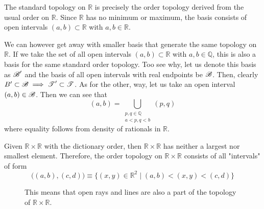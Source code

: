   \begin{example}
    The standard topology on $\mathbb{R}$ is precisely the order topology derived from the usual order on $\mathbb{R}$. Since $\mathbb{R}$ has no minimum or maximum, the basis consists of open intervals $(a, b) \subset \mathbb{R}$ with $a, b \in \mathbb{R}$. 
  \end{example}

  \begin{example}
    We can however get away with smaller basis that generate the same topology on $\mathbb{R}$. If we take the set of all open intervals $(a, b) \subset \mathbb{R}$ with $a, b \in \mathbb{Q}$, this is also a basis for the same standard order topology. Too see why, let us denote this basis as $\B^\prime$ and the basis of all open intervals with real endpoints be $\B$. Then, clearly $B^\prime \subset \B \implies \T^\prime \subset \T$. As for the other, way, let us take an open interval $(a, b) \in \B$. Then we can see that 
    \begin{equation}
      (a, b) = \bigcup_{\substack{p, q \in \mathbb{Q} \\ a < p, q < b}} (p, q)
    \end{equation}
    where equality follows from density of rationals in $\mathbb{R}$. 
  \end{example}

  \begin{example}
    Given $\mathbb{R} \times \mathbb{R}$ with the dictionary order, then $\mathbb{R} \times \mathbb{R}$ has neither a largest nor smallest element. Therefore, the order topology on $\mathbb{R} \times \mathbb{R}$ consists of all "intervals" of form
    \begin{equation}
      \big((a, b), (c, d) \big) \equiv  \{(x, y) \in \mathbb{R}^2 \mid (a, b) < (x, y) < (c, d)\}
    \end{equation}

    \begin{figure}[H]
      \centering 
      \caption{This means that open rays and lines are also a part of the topology of $\mathbb{R} \times \mathbb{R}$. } 
      \label{fig:r2_dict_order}
    \end{figure}
  \end{example}

